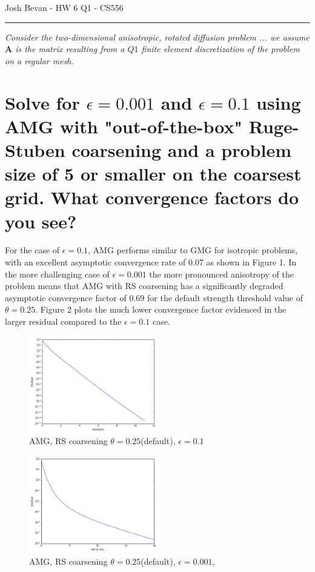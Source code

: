 \documentclass[letterpaper,10pt]{article}
\begin{document}
\begin{flushright}
{\Large Josh Bevan - HW 6 Q1 - CS556}
\end{flushright}
\vskip -0.1in
\hrule
\vskip 0.3in

\textit{Consider the two-dimensional anisotropic, rotated diffusion problem ... we assume $\mathbf{A}$ is the matrix resulting from a $Q1$ finite element discretization of the problem on a regular mesh.}
\section*{Solve for $\epsilon=0.001$ and $\epsilon=0.1$ using AMG with "out-of-the-box" Ruge-Stuben coarsening and a problem size of 5 or smaller on the coarsest grid. What convergence factors do you see?}
For the case of $\epsilon=0.1$, AMG performs similar to GMG for isotropic problems, with an excellent asymptotic convergence rate of 0.07 as shown in Figure 1. In the more challenging case of $\epsilon=0.001$ the more pronounced anisotropy of the problem means that AMG with RS coarsening has a significantly degraded asymptotic convergence factor of 0.69 for the default strength threshold value of $\theta=0.25$. Figure 2 plots the much lower convergence factor evidenced in the larger residual compared to the $\epsilon=0.1$ case.

\begin{figure}[!htb]
\centering
\includegraphics[width=0.5\textwidth]{RS01.PNG}
\caption{AMG, RS coarsening $\theta=0.25$(default), $\epsilon=0.1$}
\end{figure}

\begin{figure}[!htb]
\centering
\includegraphics[width=0.5\textwidth]{RS25.PNG}
\caption{AMG, RS coarsening $\theta=0.25$(default), $\epsilon=0.001$, }
\end{figure}
\end{document}
